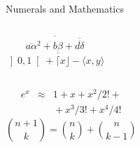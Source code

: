 \documentclass{beamer}
\begin{document}
\begin{darkframes}
\begin{frame}[label=math]{Numerals and Mathematics}
\begin{columns}[onlytextwidth]
          $$\overline{\overline{a\alpha}^2+\underline{b\beta}
           +\overline{\overline{d\delta}}}$$
          $\left] 0,1\right[ + \lceil x \rfloor - \langle x,y\rangle$
      \end{columns}
      \begin{columns}[onlytextwidth]
          \begin{eqnarray*}
           e^x &\approx& 1+x+x^2/2! + \\
             && {}+x^3/3! + x^4/4!
          \end{eqnarray*}
          $${n+1\choose k} = {n\choose k} + {n \choose k-1}$$
      \end{columns}
    \end{frame}


\end{darkframes}
\end{document}
